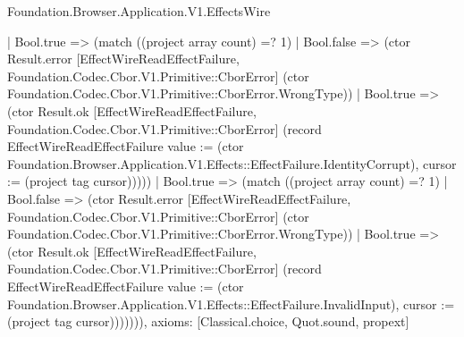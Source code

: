 \begin{lexlean}{Foundation.Browser.Application.V1.EffectsWire}
\begin{semanticmodule}
{          | Bool.true => (match ((project array count) =? 1)
            | Bool.false => (ctor Result.error [EffectWireReadEffectFailure, Foundation.Codec.Cbor.V1.Primitive::CborError] (ctor Foundation.Codec.Cbor.V1.Primitive::CborError.WrongType))
            | Bool.true => (ctor Result.ok [EffectWireReadEffectFailure, Foundation.Codec.Cbor.V1.Primitive::CborError] (record EffectWireReadEffectFailure {value := (ctor Foundation.Browser.Application.V1.Effects::EffectFailure.IdentityCorrupt), cursor := (project tag cursor)}))))
        | Bool.true => (match ((project array count) =? 1)
          | Bool.false => (ctor Result.error [EffectWireReadEffectFailure, Foundation.Codec.Cbor.V1.Primitive::CborError] (ctor Foundation.Codec.Cbor.V1.Primitive::CborError.WrongType))
          | Bool.true => (ctor Result.ok [EffectWireReadEffectFailure, Foundation.Codec.Cbor.V1.Primitive::CborError] (record EffectWireReadEffectFailure {value := (ctor Foundation.Browser.Application.V1.Effects::EffectFailure.InvalidInput), cursor := (project tag cursor)})))))),
  axioms: [Classical.choice, Quot.sound, propext]
}


\end{semanticmodule}
\end{lexlean}
